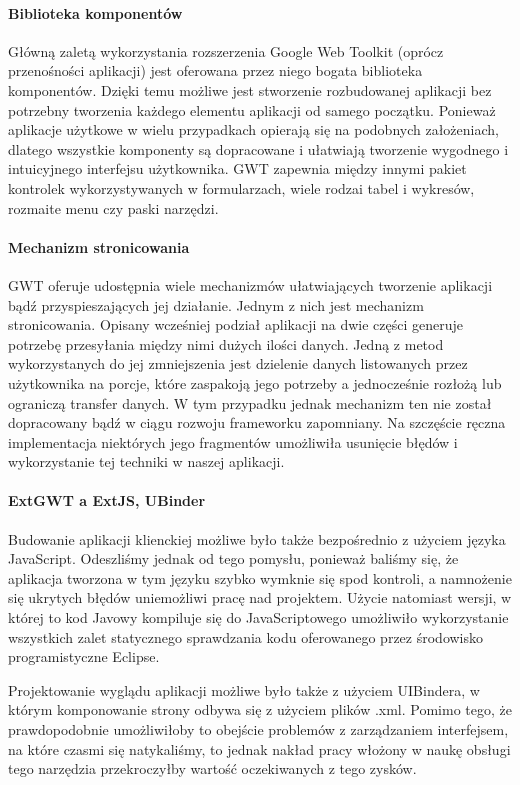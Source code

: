 \documentclass[licencjacka]{pracamgr}
\begin{document}
\paragraph{Biblioteka komponentów}
Główną zaletą wykorzystania rozszerzenia Google Web Toolkit (oprócz przenośności aplikacji) jest oferowana przez niego bogata biblioteka komponentów. Dzięki temu możliwe jest stworzenie rozbudowanej aplikacji bez potrzebny tworzenia każdego elementu aplikacji od samego początku. Ponieważ aplikacje użytkowe w wielu przypadkach opierają się na podobnych założeniach, dlatego wszystkie komponenty są dopracowane i ułatwiają tworzenie wygodnego i intuicyjnego interfejsu użytkownika. GWT zapewnia między innymi pakiet kontrolek wykorzystywanych w formularzach, wiele rodzai tabel i wykresów, rozmaite menu czy paski narzędzi.

\paragraph{Mechanizm stronicowania}
GWT oferuje udostępnia wiele mechanizmów ułatwiających tworzenie aplikacji bądź przyspieszających jej działanie. Jednym z nich jest mechanizm stronicowania. Opisany wcześniej podział aplikacji na dwie części generuje potrzebę przesyłania między nimi dużych ilości danych. Jedną z metod wykorzystanych do jej zmniejszenia jest dzielenie danych listowanych przez użytkownika na porcje, które zaspakoją jego potrzeby a jednocześnie rozłożą lub ograniczą transfer danych. W tym przypadku jednak mechanizm ten nie został dopracowany bądź w ciągu rozwoju frameworku zapomniany. Na szczęście ręczna implementacja niektórych jego fragmentów umożliwiła usunięcie błędów i wykorzystanie tej techniki w naszej aplikacji.

\paragraph{ExtGWT a ExtJS, UBinder}
Budowanie aplikacji klienckiej możliwe było także bezpośrednio z użyciem języka JavaScript. Odeszliśmy jednak od tego pomysłu, ponieważ baliśmy się, że aplikacja tworzona w tym języku szybko wymknie się spod kontroli, a namnożenie się ukrytych błędów uniemożliwi pracę nad projektem. Użycie natomiast wersji, w której to kod Javowy kompiluje się do JavaScriptowego umożliwiło wykorzystanie wszystkich zalet statycznego sprawdzania kodu oferowanego przez środowisko programistyczne Eclipse.

Projektowanie wyglądu aplikacji możliwe było także z użyciem UIBindera, w którym komponowanie strony odbywa się z użyciem plików .xml. Pomimo tego, że prawdopodobnie umożliwiłoby to obejście problemów z zarządzaniem interfejsem, na które czasmi się natykaliśmy, to jednak nakład pracy włożony w naukę obsługi tego narzędzia przekroczyłby wartość oczekiwanych z tego zysków.
\end{document}
